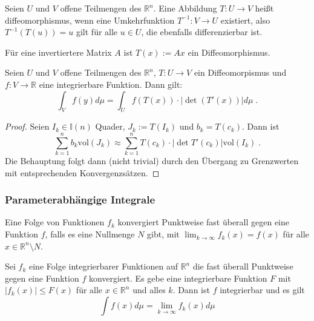 \begin{Definition}[Diffeomorphismus]
Seien $U$ und $V$ offene Teilmengen des $\mathbb{R}^n$. Eine Abbildung  $T: U \to V$ heißt diffeomorphismus, wenn eine  Umkehrfunktion $T^{-1}: V  \to U$ existiert, also $T^{-1} (T (u)) = u$ gilt für alle $u \in U$, die ebenfalls differenzierbar ist.
\end{Definition}

\begin{Beispiel}
Für eine invertiertere Matrix $A$ ist $T(x):= Ax$ ein Diffeomorphismus.
\end{Beispiel}

\begin{Satz}
Seien $U$ und $V$ offene Teilmengen des $\mathbb{R}^n$, $T: U \to V$ ein Diffeomorpismus und $f: V \to \mathbb{R}$ eine integrierbare Funktion. Dann gilt:
$$ \int_V  f(y)  d \mu = \int_U f(T (x))  \cdot | \det(T' (x)) | d \mu   \; .$$
\end{Satz}
\begin{proof}
Seien $I_k \in \mathbb{I}(n)$ Quader, $J_k := T(I_k)$ und $b_k = T(c_k)$. Dann ist 
$$\sum_{k=1}^n  b_k  \text{vol}(J_k) \approx  \sum_{k=1}^n T(c_k) \cdot | \det T' (c_k)|  \text{vol}(I_k) \; .$$
Die Behauptung folgt dann (nicht trivial) durch den Übergang zu Grenzwerten mit entsprechenden Konvergenzsätzen.
\end{proof}




\subsubsection{Parameterabhängige Integrale}

\begin{Definition}
Eine Folge von Funktionen $f_k$ konvergiert Punktweise fast überall gegen eine Funktion $f$, falls es eine Nullmenge $N$ gibt, mit 
$\lim_{k \to \infty} f_k (x) = f(x)$ für alle $x \in \mathbb{R}^n \setminus N$.
\end{Definition}

\begin{Satz}
Sei $f_k$ eine Folge integrierbarer Funktionen auf $\mathbb{R}^n$ die fast überall Punktweise gegen eine Funktion $f$ konvergiert.
Es gebe eine integrierbare Funktion $F$ mit $|f_k (x)| \leq F(x) $ für alle $x \in \mathbb{R}^n$ und alles $k$. Dann ist $f$ integrierbar und es gilt
$$ \int f(x) d \mu = \lim_{k \to \infty} f_k(x) d \mu $$
\end{Satz}

